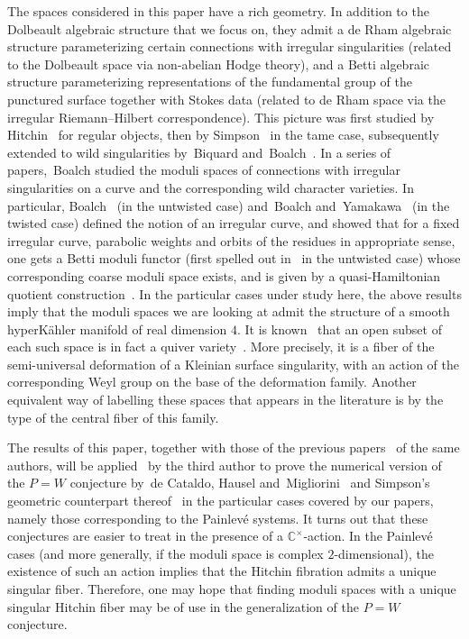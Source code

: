\documentclass[pdftex]{sigma}
\newcommand{\C}{{\mathbb C}} %
\numberwithin{equation}{section}
\begin{document}
The spaces considered in this paper have a rich geometry. In
 addition to the Dolbeault algebraic structure that we focus on, they
 admit a de Rham algebraic structure parameterizing certain
 connections with irregular singularities (related to the Dolbeault
 space via non-abelian Hodge theory), and a Betti algebraic structure
 parameterizing representations of the fundamental group of the
 punctured surface together with Stokes data (related to de Rham
 space via the irregular Riemann--Hilbert correspondence). This
 picture was first studied by Hitchin~\cite{Hit_selfduality} for
 regular objects, then by Simpson~\cite{Sim} in the tame case,
 subsequently extended to wild singularities by~Biquard
 and~Boalch~\cite{BB}. In a series of papers,~Boalch studied the
 moduli spaces of connections with irregular singularities on a curve
 and the corresponding wild character varieties. In particular,
 Boalch~\cite{Boalch1} (in the untwisted case) and~Boalch
 and~Yamakawa~\cite{BY} (in the twisted case) defined the notion of
 an irregular curve, and showed that for a fixed irregular curve,
 parabolic weights and orbits of the residues in appropriate sense,
 one gets a Betti moduli functor (first spelled out in~\cite{Boalch3}
 in the untwisted case) whose corresponding coarse moduli space
 exists, and is given by a quasi-Hamiltonian quotient
 construction~\cite{AMM}. In the particular cases under study here,
 the above results imply that the moduli spaces we are looking at
 admit the structure of a smooth hyperK\"ahler manifold of real
 dimension $4$. It is known~\cite{Boalch2, CB, KraftProcesi} that an open
 subset of each such space is in fact a quiver
 variety~\cite{KN}. More precisely, it is a fiber of the
 semi-universal deformation of a Kleinian surface singularity, with
 an action of the corresponding Weyl group on the base of the
 deformation family. Another equivalent way of labelling these spaces
 that appears in the literature is by the type of the central fiber
 of this family.

The results of this paper, together with those of the previous
 papers~\cite{ISS, ISS2} of the same \mbox{authors}, will be
 applied~\cite{Sz_PW} by the third author to prove the numerical
 version of the \mbox{$P=W$} conjecture by~de Cataldo, Hausel
 and~Migliorini~\cite{dCHM} and Simpson's geometric counterpart
 thereof~\cite{Sim_boundary} in the particular cases covered by our
 papers, namely those corresponding to the Painlev\'e systems. It
 turns out that these conjectures are easier to treat in the presence
 of a $\C^{\times}$-action. In the Painlev\'e cases (and more
 generally, if the moduli space is complex $2$-dimensional), the
 existence of such an action implies that the Hitchin fibration
 admits a unique singular fiber. Therefore, one may hope that finding
 moduli spaces with a unique singular Hitchin fiber may be of use in
 the generalization of the $P=W$ conjecture.
\end{document}
